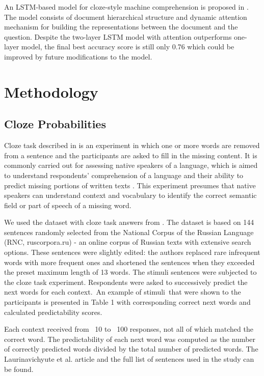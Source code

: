 \documentclass[a4paper]{article}
\begin{document}
An LSTM-based model for cloze-style machine comprehension is proposed in \cite{wang-cloze}. The model consists of document hierarchical structure and dynamic attention mechanism for building the representations between the document and the question. Despite the two-layer LSTM model with attention outperforms one-layer model, the final best accuracy score is still only 0.76 which could be improved by future modifications to the model.


\section{Methodology}

\subsection{Cloze Probabilities}

Cloze task described in \cite{taylor:1953} is an experiment in which one or more words are removed from a sentence and the participants are asked to fill in the missing content. It is commonly carried out for assessing native speakers of a language, which is aimed to understand respondents’ comprehension of a language and their ability to predict missing portions of written texts \cite{laurinavichyute}. This experiment presumes that native speakers can understand context and vocabulary to identify the correct semantic field or part of speech of a missing word.

We used the dataset with cloze task answers from \cite{laurinavichyute}. The dataset is based on 144 sentences randomly selected from the National Corpus of the Russian Language (RNC, ruscorpora.ru) - an online corpus of Russian texts with extensive search options. These sentences were slightly edited: the authors replaced rare infrequent words with more frequent ones and shortened the sentences when they exceeded the preset maximum length of 13 words. The stimuli sentences were subjected to the cloze task experiment. Respondents were asked to successively predict the next words for each context. An example of stimuli that were shown to the participants is presented in Table 1 with corresponding correct next words and calculated predictability scores.

Each context received from ~10 to ~100 responses, not all of which matched the correct word. The predictability of each next word was computed as the number of correctly predicted words divided by the total number of predicted words. The Laurinavichyute et al. article and the full list of sentences used in the study can be found. 
\end{document}

